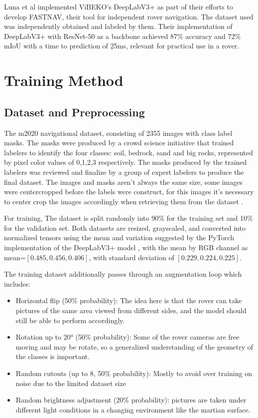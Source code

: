 \documentclass[10pt, conference]{IEEEtran}
\begin{document}
Luna et al \cite{Luna2025} implemented ViBEKO's DeepLabV3+ as part
of their efforts to develop FASTNAV, their tool for independent rover navigation. The dataset used
was independently obtained and labeled by them. Their implementation of DeepLabV3+ with ResNet-50
as a backbone achieved 87\% accuracy and 72\% mIoU with a time to prediction of 25ms, relevant
for practical use in a rover.


\section{Training Method}

\subsection{Dataset and Preprocessing}

The m2020 navigational dataset, consisting of 2355 images with class label masks.
The masks were produced by a crowd science initiative that trained labelers to
identify the four classes: soil, bedrock, sand and big rocks, represented by
pixel color values of 0,1,2,3 respectively. The masks produced by the trained
labelers was reviewed and finalize by a group of expert labelers to produce the final
dataset. The images and masks aren't always the same size, some images
were centercropped before the labels were construct, for this images it's necessary
to center crop the images accordingly when retrieving them from the dataset \cite{Swan2021}.

For training, The dataset is split 
randomly into 90\% for the training set and 10\% for the validation 
set. Both datasets are resized, grayscaled, and converted into 
normalized tensors using the mean and variation suggested by the 
PyTorch implementation of the DeepLabV3+ model \cite{PytorchVision2026}, with
the mean by RGB channel as mean=$[0.485,0.456,0.406]$, with standard deviation of
$[0.229,0.224,0.225]$. 

The training dataset additionally passes through an augmentation loop 
which includes:
\begin{itemize}
\item Horizontal flip (50\% probability): The idea here is that the rover can take
  pictures of the same area viewed from different sides, and the model should
  still be able to perform accordingly.
\item Rotation up to 20° (50\% probability): Some of the rover cameras are free moving
  and may be rotate, so a generalized understanding of the geometry of the classes is important.
\item Random cutouts (up to 8, 50\% probability): Mostly to avoid over training on noise
  due to the limited dataset size
\item Random brightness adjustment (20\% probability): pictures are taken under different
  light conditions in a changing environment like the martian surface.
\end{itemize}
\end{document}
